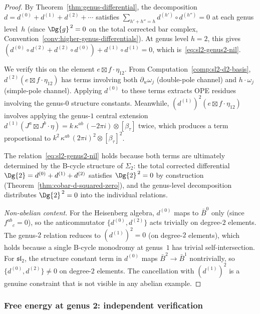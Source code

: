 \begin{proof}
By Theorem~\ref{thm:genus-differential}, the decomposition
$d = d^{(0)} + d^{(1)} + d^{(2)} + \cdots$ satisfies
$\sum_{h'+h''=h} d^{(h')} \circ d^{(h'')} = 0$ at each genus
level~$h$ (since $\Dg{g}^{\,2} = 0$ on the total corrected bar complex, Convention~\ref{conv:higher-genus-differentials}).
At genus level $h = 2$, this gives
$(d^{(0)} \circ d^{(2)} + d^{(2)} \circ d^{(0)}) + d^{(1)} \circ d^{(1)} = 0$,
which is~\eqref{eq:sl2-genus2-nil}.

We verify this on the element $e \boxtimes f \cdot \eta_{12}$.
From Computation~\ref{comp:sl2-d2-basis},
$d^{(2)}(e \boxtimes f \cdot \eta_{12})$ has
terms involving both $\partial_w\omega_j$ (double-pole channel)
and $h \cdot \omega_j$ (simple-pole channel).  Applying $d^{(0)}$
to these terms extracts OPE residues involving the genus-$0$
structure constants.  Meanwhile, $(d^{(1)})^2(e \boxtimes f \cdot \eta_{12})$
involves applying the genus-$1$ central extension
$d^{(1)}(J^a \boxtimes J^b \cdot \eta)
= k\,\kappa^{ab}\, (-2\pi i) \otimes [\beta_{\tau}]$
twice, which produces a term proportional to
$k^2\,\kappa^{ab}\, (2\pi i)^2 \otimes [\beta_\tau]^2$.

The relation~\eqref{eq:sl2-genus2-nil} holds because both terms are
ultimately determined by the B-cycle structure of $\Sigma_2$:
the total corrected differential $\Dg{2} = d^{(0)} + d^{(1)} + d^{(2)}$ satisfies
$\Dg{2}^{\,2} = 0$ by construction (Theorem~\ref{thm:cobar-d-squared-zero}),
and the genus-level decomposition distributes $\Dg{2}^{\,2} = 0$ into
the individual relations.

\emph{Non-abelian content.}
For the Heisenberg algebra, $d^{(0)}$ maps to
$\bar{B}^0$ only (since $f^{ab}{}_c = 0$), so the anticommutator
$\{d^{(0)}, d^{(2)}\}$ acts trivially on degree-$2$ elements.
The genus-$2$ relation reduces to $(d^{(1)})^2 = 0$
(on degree-$2$ elements), which holds because a single B-cycle
monodromy at genus~$1$ has trivial self-intersection.
For $\mathfrak{sl}_2$, the structure constant term in $d^{(0)}$
maps $\bar{B}^2 \to \bar{B}^1$ nontrivially, so
$\{d^{(0)}, d^{(2)}\} \neq 0$ on degree-$2$ elements.
The cancellation with $(d^{(1)})^2$ is a genuine constraint
that is not visible in any abelian example.
\end{proof}

\subsubsection{Free energy at genus 2: independent verification}

